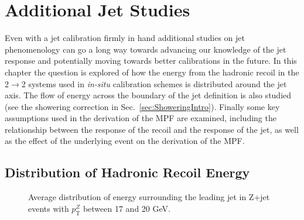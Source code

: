 \chapter{Additional Jet Studies}

Even with a jet calibration firmly in hand additional studies on jet phenomenology can go a long way towards advancing our knowledge of the jet response and potentially moving towards better calibrations in the future.  
In this chapter the question is explored of how the energy from the hadronic recoil in the 2$\rightarrow$2 systems used in \textit {in-situ} calibration schemes is distributed around the jet axis.  
The flow of energy across the boundary of the jet definition is also studied (see the showering correction in Sec.~\ref{sec:ShoweringIntro}).  
Finally some key assumptions used in the derivation of the MPF are examined, including the relationship between the response of the recoil and the response of the jet, as well as the effect of the underlying event on the derivation of the MPF.  

\section{Distribution of Hadronic Recoil Energy}
\label{Sec:EnergyDensity}
\begin{figure}[!ht]
 \begin{center}
 \end{center}
 \caption[Recoil energy distribution in Z+jet, 17-20 GeV]
 {\small Average distribution of energy surrounding the leading jet in Z+jet events with $p_{\mathrm T}^{Z}$ between 17 and 20 GeV. }
 \label{Fig:EMShape17-20}
\end{figure}

